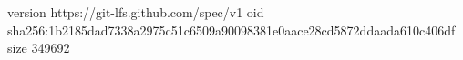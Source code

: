 version https://git-lfs.github.com/spec/v1
oid sha256:1b2185dad7338a2975c51c6509a90098381e0aace28cd5872ddaada610c406df
size 349692
